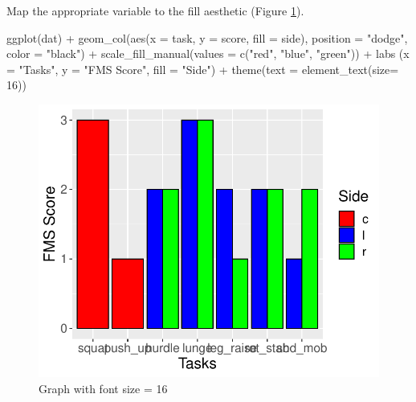 \documentclass[
]{book}
\newenvironment{Shaded}{\begin{snugshade}}{\end{snugshade}}
\newcommand{\AttributeTok}[1]{\textcolor[rgb]{0.77,0.63,0.00}{#1}}
\newcommand{\DecValTok}[1]{\textcolor[rgb]{0.00,0.00,0.81}{#1}}
\newcommand{\FunctionTok}[1]{\textcolor[rgb]{0.00,0.00,0.00}{#1}}
\newcommand{\NormalTok}[1]{#1}
\newcommand{\SpecialCharTok}[1]{\textcolor[rgb]{0.00,0.00,0.00}{#1}}
\newcommand{\StringTok}[1]{\textcolor[rgb]{0.31,0.60,0.02}{#1}}
\begin{document}
Map the appropriate variable to the fill aesthetic (Figure \ref{fig:FIG-BAR-GRAPH-FONTSIZE}).

\begin{Shaded}
\begin{Highlighting}[]
\FunctionTok{ggplot}\NormalTok{(dat) }\SpecialCharTok{+}
  \FunctionTok{geom\_col}\NormalTok{(}\FunctionTok{aes}\NormalTok{(}\AttributeTok{x =}\NormalTok{ task, }\AttributeTok{y =}\NormalTok{ score, }\AttributeTok{fill =}\NormalTok{ side), }\AttributeTok{position =} \StringTok{"dodge"}\NormalTok{, }\AttributeTok{color =} \StringTok{"black"}\NormalTok{) }\SpecialCharTok{+}
  \FunctionTok{scale\_fill\_manual}\NormalTok{(}\AttributeTok{values =} \FunctionTok{c}\NormalTok{(}\StringTok{"red"}\NormalTok{, }\StringTok{"blue"}\NormalTok{, }\StringTok{"green"}\NormalTok{)) }\SpecialCharTok{+}
  \FunctionTok{labs}\NormalTok{ (}\AttributeTok{x =} \StringTok{"Tasks"}\NormalTok{,}
        \AttributeTok{y =} \StringTok{"FMS Score"}\NormalTok{,}
        \AttributeTok{fill =} \StringTok{"Side"}\NormalTok{) }\SpecialCharTok{+}
  \FunctionTok{theme}\NormalTok{(}\AttributeTok{text =} \FunctionTok{element\_text}\NormalTok{(}\AttributeTok{size=} \DecValTok{16}\NormalTok{))}
\end{Highlighting}
\end{Shaded}

\begin{figure}

{\centering \includegraphics{se201_stats_book_files/figure-latex/FIG-BAR-GRAPH-FONTSIZE-1} 

}

\caption[Graph with font size = 16]{Graph with font size = 16}\label{fig:FIG-BAR-GRAPH-FONTSIZE}
\end{figure}
\end{document}
